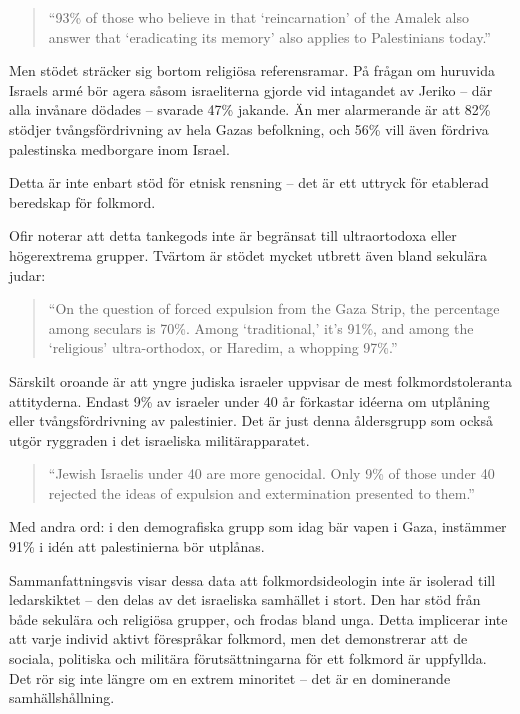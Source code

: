 \begin{quote}
“93\% of those who believe in that ‘reincarnation’ of the Amalek also answer that ‘eradicating its memory’ also applies to Palestinians today.”
\end{quote}

Men stödet sträcker sig bortom religiösa referensramar. På frågan om huruvida Israels armé bör agera såsom israeliterna gjorde vid intagandet av Jeriko – där alla invånare dödades – svarade 47\% jakande. Än mer alarmerande är att 82\% stödjer tvångsfördrivning av hela Gazas befolkning, och 56\% vill även fördriva palestinska medborgare inom Israel.

Detta är inte enbart stöd för etnisk rensning – det är ett uttryck för etablerad beredskap för folkmord.

Ofir noterar att detta tankegods inte är begränsat till ultraortodoxa eller högerextrema grupper. Tvärtom är stödet mycket utbrett även bland sekulära judar:

\begin{quote}
“On the question of forced expulsion from the Gaza Strip, the percentage among seculars is 70\%. Among ‘traditional,’ it’s 91\%, and among the ‘religious’ ultra-orthodox, or Haredim, a whopping 97\%.”
\end{quote}

Särskilt oroande är att yngre judiska israeler uppvisar de mest folkmordstoleranta attityderna. Endast 9\% av israeler under 40 år förkastar idéerna om utplåning eller tvångsfördrivning av palestinier. Det är just denna åldersgrupp som också utgör ryggraden i det israeliska militärapparatet.

\begin{quote}
“Jewish Israelis under 40 are more genocidal. Only 9\% of those under 40 rejected the ideas of expulsion and extermination presented to them.”
\end{quote}

Med andra ord: i den demografiska grupp som idag bär vapen i Gaza, instämmer 91\% i idén att palestinierna bör utplånas.

Sammanfattningsvis visar dessa data att folkmordsideologin inte är isolerad till ledarskiktet – den delas av det israeliska samhället i stort. Den har stöd från både sekulära och religiösa grupper, och frodas bland unga. Detta implicerar inte att varje individ aktivt förespråkar folkmord, men det demonstrerar att de sociala, politiska och militära förutsättningarna för ett folkmord är uppfyllda. Det rör sig inte längre om en extrem minoritet – det är en dominerande samhällshållning.





